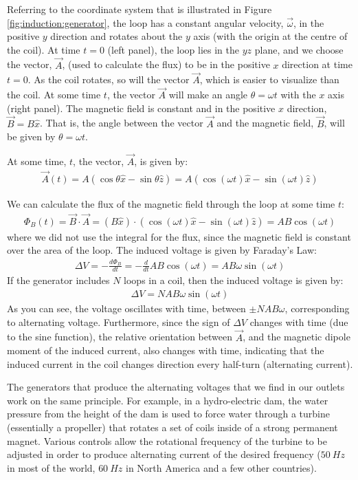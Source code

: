 Referring to the coordinate system that is illustrated in Figure \ref{fig:induction:generator}, the loop has a constant angular velocity, $\vec\omega$, in the positive $y$ direction and rotates about the $y$ axis (with the origin at the centre of the coil). At time $t=0$ (left panel), the loop lies in the $yz$ plane, and we choose the vector, $\vec A$, (used to calculate the flux) to be in the positive $x$ direction at time $t=0$. As the coil rotates, so will the vector $\vec A$, which is easier to visualize than the coil. At some time $t$, the vector $\vec A$ will make an angle $\theta=\omega t$ with the $x$ axis (right panel). The magnetic field is constant and in the positive $x$ direction, $\vec B = B\hat x$. That is, the angle between the vector $\vec A$ and the magnetic field, $\vec B$, will be given by $\theta = \omega t$. 

At some time, $t$, the vector, $\vec A$, is given by:
\begin{align*}
\vec A(t) = A(\cos\theta \hat x -\sin\theta \hat z) = A(\cos(\omega t) \hat x -\sin(\omega t)\hat z)
\end{align*}

We can calculate the flux of the magnetic field through the loop at some time $t$:
\begin{align*}
\Phi_B(t) =  \vec B \cdot \vec A = (B\hat x) \cdot (\cos(\omega t) \hat x -\sin(\omega t)\hat z)=AB\cos(\omega t)
\end{align*}
where we did not use the integral for the flux, since the magnetic field is constant over the area of the loop. The induced voltage is given by Faraday's Law:
\begin{align*}
\Delta V = - \frac{d\Phi_B}{dt}  =  - \frac{d}{dt}AB\cos(\omega t) =  AB\omega\sin(\omega t)
\end{align*}
If the generator includes $N$ loops in a coil, then the induced voltage is given by:
\begin{align*}
\Delta V = NAB\omega\sin(\omega t)
\end{align*}
As you can see, the voltage oscillates with time, between $\pm NAB\omega$, corresponding to alternating voltage. Furthermore, since the sign of $\Delta V$ changes with time (due to the sine function), the relative orientation between $\vec A$, and the magnetic dipole moment of the induced current, also changes with time, indicating that the induced current in the coil changes direction every half-turn (alternating current).

The generators that produce the alternating voltages that we find in our outlets work on the same principle. For example, in a hydro-electric dam, the water pressure from the height of the dam is used to force water through a turbine (essentially a propeller) that rotates a set of coils inside of a strong permanent magnet. Various controls allow the rotational frequency of the turbine to be adjusted in order to produce alternating current of the desired frequency ($\SI{50}{Hz}$ in most of the world, $\SI{60}{Hz}$ in North America and a few other countries).

